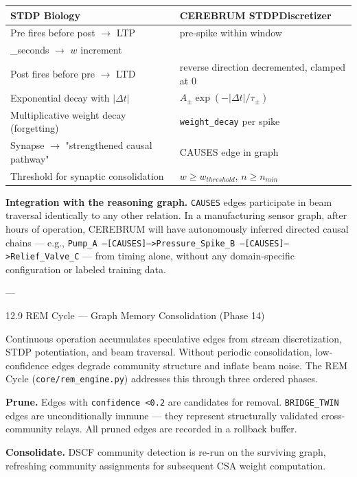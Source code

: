 \documentclass[10pt,journal,compsoc]{IEEEtran}
\begin{document}
\begin{center}
\begin{tabularx}{\columnwidth}{|>{\raggedright\arraybackslash}X|>{\raggedright\arraybackslash}X|}
\hline
STDP Biology & CEREBRUM STDPDiscre\-tizer \\ \hline
Pre fires before post $\to$ LTP & pre-spike within window\\_seconds $\to$ $w$ increment \\ \hline
Post fires before pre $\to$ LTD & reverse direction decremented, clamped at 0 \\ \hline
Exponential decay with $|\Delta t|$ & $A_\pm \exp(-|\Delta t|/\tau_\pm)$ \\ \hline
Multip\-licative weight decay (forgetting) & \texttt{weight\_decay} per spike \\ \hline
Synapse $\to$ "stren\-gthened causal pathway" & CAUSES edge in graph \\ \hline
Threshold for synaptic conso\-lidation & $w \geq w_{threshold}$, $n \geq n_{min}$ \\ \hline
\end{tabularx}
\end{center}

\textbf{Integration with the reasoning graph.} \texttt{CAUSES} edges participate in beam traversal identically to any other relation. In a manuf\-acturing sensor graph, after hours of operation, CEREBRUM will have auton\-omously inferred directed causal chains — e.g., \texttt{Pump\_A --[CAUSES]--\textgreater  Pressure\_Spike\_B --[CAUSES]--\textgreater  Relief\_Valve\_C} — from timing alone, without any domain-specific confi\-guration or labeled training data.

---

12.9 REM Cycle — Graph Memory Consol\-idation (Phase 14)

Continuous operation accumulates speculative edges from stream discr\-etization, STDP poten\-tiation, and beam traversal. Without periodic conso\-lidation, low-confidence edges degrade community structure and inflate beam noise. The REM Cycle (\texttt{core/rem\_engine.py}) addresses this through three ordered phases.

\textbf{Prune.} Edges with \texttt{confidence \textless  0.2} are candidates for removal. \texttt{BRIDGE\_TWIN} edges are uncon\-ditionally immune — they represent struc\-turally validated cross-community relays. All pruned edges are recorded in a rollback buffer.

\textbf{Consolidate.} DSCF community detection is re-run on the surviving graph, refreshing community assignments for subsequent CSA weight computation.
\end{document}
